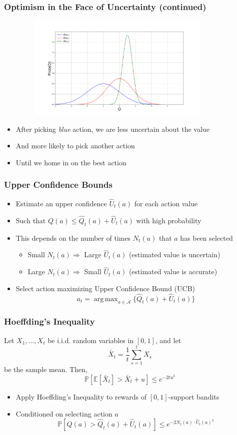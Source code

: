 \documentclass[handout]{beamer}
\DeclareMathOperator*{\argmax}{arg\,max}
\begin{document}
\begin{frame}
\frametitle{Optimism in the Face of Uncertainty (continued)}
\pause
\includegraphics[width=12cm, height=5cm]{q_pdfs2.png}
\begin{itemize}[<+->]
\item After picking {\em blue} action, we are less uncertain about the value
\item And more likely to pick another action
 \item Until we home in on the best action
\end{itemize}
\end{frame}



\begin{frame}
\frametitle{Upper Confidence Bounds}
\pause
\begin{itemize}[<+->]
\item Estimate an upper confidence $\hat{U}_t(a)$ for each action value
\item Such that $Q(a) \leq \hat{Q}_t(a) + \hat{U}_t(a)$ with high probability
\item This depends on the number of times $N_t(a)$ that $a$ has been selected
\begin{itemize}
\item Small $N_t(a) \Rightarrow$ Large $\hat{U}_t(a)$ (estimated value is uncertain)
\item Large $N_t(a) \Rightarrow$ Small $\hat{U}_t(a)$ (estimated value is accurate)
\end{itemize}
\item Select action maximizing Upper Confidence  Bound (UCB)
$$a_t = \argmax_{a\in\mathcal{A}} \{ \hat{Q}_t(a) + \hat{U}_t(a) \}$$
\end{itemize}
\end{frame}

\begin{frame}
\frametitle{Hoeffding's Inequality}
\pause
\begin{theorem}
Let $X_1, \ldots, X_t$ be i.i.d. random variables in $[0,1]$, and let $$\bar{X}_t = \frac 1 t \sum_{s=1}^t X_s$$ be the sample mean. Then,
$$\mathbb{P}[\mathbb{E}[\bar{X}_t] > \bar{X}_t + u] \leq e^{-2tu^2}$$
\end{theorem}
\begin{itemize}[<+->]
\item Apply Hoeffding's Inequality to rewards of $[0,1]$-support bandits
\item Conditioned on selecting action $a$
$$\mathbb{P}[Q(a) > \hat{Q}_t(a) + \hat{U}_t(a)] \leq e^{-2N_t(a) \cdot \hat{U}_t(a)^2}$$
\end{itemize}
\end{frame}
\end{document}
